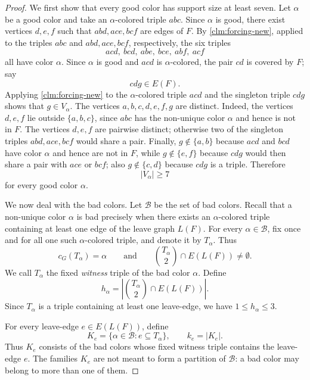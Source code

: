 \documentclass[10pt,a4paper]{amsart}
\newcommand{\cB}{\mathcal{B}}
\begin{document}
\begin{proof}
    We first show that every good color has support size at least seven.
    Let $\alpha$ be a good color and take an $\alpha$-colored triple $abc$.
    Since $\alpha$ is good, there exist vertices $d,e,f$ such that $abd,ace,bcf$ are edges of $F$.
    By \cref{clm:forcing-new}, applied to the triples
    $abc$ and $abd,ace,bcf$, respectively, the six triples
    \[
        acd,\ bcd,\ abe,\ bce,\ abf,\ acf
    \]
    all have color $\alpha$.
    Since $\alpha$ is good and $acd$ is $\alpha$-colored, the pair $cd$ is
    covered by $F$; say
    \[
        cdg\in E(F).
    \]
    Applying \cref{clm:forcing-new} to the $\alpha$-colored triple $acd$ and
    the singleton triple $cdg$ shows that $g\in V_\alpha$.
    The vertices $a,b,c,d,e,f,g$ are distinct.  Indeed, the vertices
    $d,e,f$ lie outside $\{a,b,c\}$, since $abc$ has the non-unique color
    $\alpha$ and hence is not in $F$.  The vertices $d,e,f$ are pairwise
    distinct; otherwise two of the singleton triples $abd,ace,bcf$ would
    share a pair.  Finally, $g\notin\{a,b\}$ because $acd$ and $bcd$ have
    color $\alpha$ and hence are not in $F$, while $g\notin\{e,f\}$ because
    $cdg$ would then share a pair with $ace$ or $bcf$; also
    $g\notin\{c,d\}$ because $cdg$ is a triple.  Therefore
    \begin{equation}\label{eq:good-support-new}
        |V_\alpha|\ge 7
    \end{equation}
    for every good color $\alpha$.

    We now deal with the bad colors.  Let $\cB$ be the set of bad colors.
    Recall that a non-unique color $\alpha$ is bad precisely when there exists
    an $\alpha$-colored triple containing at least one edge of the leave graph
    $L(F)$.  For every $\alpha\in\cB$, fix once and for all one such
    $\alpha$-colored triple, and denote it by $T_\alpha$.
    Thus
    \[
        c_G(T_\alpha)=\alpha
        \qquad\text{and}\qquad
        \binom{T_\alpha}{2}\cap E(L(F))\ne\emptyset.
    \]
    We call $T_\alpha$ the fixed {\it witness} triple of the bad color $\alpha$.
    Define
    \[
        h_\alpha=
        \left|\binom{T_\alpha}{2}\cap E(L(F))\right|.
    \]
    Since $T_\alpha$ is a triple containing at least one leave-edge, we have $1\le h_\alpha\le3$.

    For every leave-edge $e\in E(L(F))$, define
    \[
        K_e=\{\alpha\in\cB: e\subseteq T_\alpha\},
        \qquad
        k_e=|K_e|.
    \]
    Thus $K_e$ consists of the bad colors whose fixed witness triple contains
    the leave-edge $e$.  The families $K_e$ are not meant to form a partition
    of $\cB$: a bad color may belong to more than one of them.



\end{proof}
\end{document}
